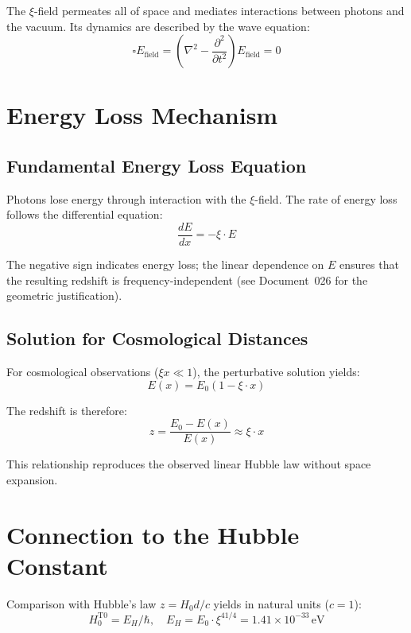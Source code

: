 	The $\xi$-field permeates all of space and mediates interactions between photons and the vacuum. Its dynamics are described by the wave equation:
	\begin{equation}
		\square E_{\text{field}} = \left(\nabla^2 - \frac{\partial^2}{\partial t^2}\right) E_{\text{field}} = 0
	\end{equation}

\section{Energy Loss Mechanism}

	\subsection{Fundamental Energy Loss Equation}

	Photons lose energy through interaction with the $\xi$-field. The rate of energy loss follows the differential equation:
	\begin{equation}
		\frac{dE}{dx} = -\xi \cdot E
	\end{equation}

	The negative sign indicates energy loss; the linear dependence on $E$ ensures that the resulting redshift is frequency-independent (see Document~026 for the geometric justification).

	\subsection{Solution for Cosmological Distances}

	For cosmological observations ($\xi x \ll 1$), the perturbative solution yields:
	\begin{equation}
		E(x) = E_0 \left(1 - \xi \cdot x\right)
	\end{equation}

	The redshift is therefore:
	\begin{equation}
		z = \frac{E_0 - E(x)}{E(x)} \approx \xi \cdot x
	\end{equation}

	This relationship reproduces the observed linear Hubble law without space expansion.

\section{Connection to the Hubble Constant}

	Comparison with Hubble's law $z = H_0 d/c$ yields in natural units ($c = 1$):
	\begin{equation}
		\boxed{H_0^{\text{T0}} = E_H/\hbar, \quad E_H = E_0 \cdot \xi^{41/4} = 1.41 \times 10^{-33}\,\text{eV}}
	\end{equation}

